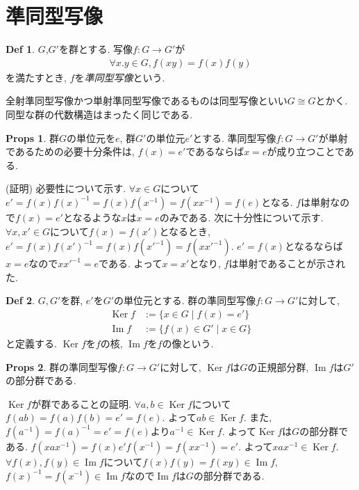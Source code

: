 \documentclass[dvipdfmx]{jsarticle}
\theoremstyle{definition}
\newtheorem{props}{Props}
\newtheorem{definition}{Def}
\numberwithin{equation}{section}
\numberwithin{props}{section}
\numberwithin{definition}{section}
\numberwithin{note}{section}
\DeclareMathOperator{\Ker}{Ker}
\DeclareMathOperator{\Image}{Im}
\begin{document}
\section{準同型写像}
\begin{definition}
     $G$,$G'$を群とする. 写像$f\colon G\to G'$が
     \begin{align}
          \forall x.y\in G, f(xy)=f(x)f(y)
     \end{align}
     を満たすとき, $f$を\emph{準同型写像}という.
\end{definition}
全射準同型写像かつ単射準同型写像であるものは同型写像といい$G\cong G$とかく. 同型な群の代数構造はまったく同じである.
\begin{props}
     群$G$の単位元を$e$, 群$G'$の単位元$e'$とする. 準同型写像$f\colon G\to G'$が単射であるための必要十分条件は, $f(x)=e'$であるならば$x=e$が成り立つことである.
\end{props}
(証明) 必要性について示す. $\forall x\in G$について$e'=f(x)f(x)^{-1}=f(x)f(x^{-1})=f(xx^{-1})=f(e)$となる. $f$は単射なので$f(x)=e'$となるような$x$は$x=e$のみである. 次に十分性について示す.
$\forall x,x'\in G$について$f(x)=f(x')$となるとき, $e'=f(x)f(x')^{-1}=f(x)f(x'^{-1})=f(xx'^{-1})$. $e'=f(x)$となるならば$x=e$なので$xx'^{-1}=e$である. よって$x=x'$となり, $f$は単射であることが示された.

\begin{definition}
     $G,G'$を群, $e'$を$G'$の単位元とする. 群の準同型写像$f\colon G\to G'$に対して,
     \begin{align}
          \Ker f   & :=\lbrace x\in G\mid f(x)=e'\rbrace    \\
          \Image f & :=\lbrace f(x)\in G'\mid x\in G\rbrace
     \end{align}
     と定義する. $\Ker f$を$f$の核, $\Image f$を$f$の像という.
\end{definition}
\begin{props}
     群の準同型写像$f\colon G\to G'$に対して, $\Ker f$は$G$の正規部分群, $\Image f$は$G'$の部分群である.
\end{props}
$\Ker f$が群であることの証明. $\forall a,b\in \Ker f$について$f(ab)=f(a)f(b)=e'=f(e)$. よって$ab\in \Ker f$. また, $f(a^{-1})=f(a)^{-1}=e'=f(e)$より$a^{-1}\in \Ker f$. よって$\Ker f$は$G$の部分群である. $f(xax^{-1})=f(x)e'f(x^{-1})=f(xx^{-1})=e'$. よって$xax^{-1}\in \Ker f$.
$\forall f(x),f(y)\in \Image f$について$f(x)f(y)=f(xy)\in \Image f$,$f(x)^{-1}=f(x^{-1})\in \Image f$なので$\Image f$は$G$の部分群である.
\end{document}
